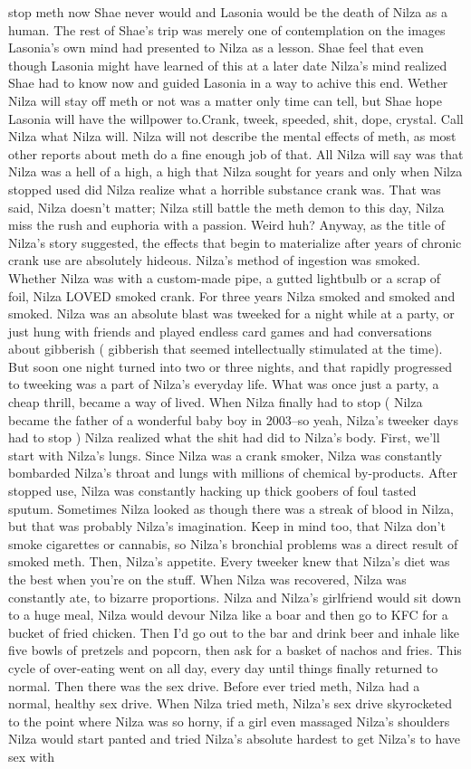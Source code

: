 \documentclass[12pt]{book}
\begin{document}
stop meth now Shae never would and Lasonia would be the death of Nilza as a human. The rest of Shae's trip was merely one of contemplation on the images Lasonia's own mind had presented to Nilza as a lesson. Shae feel that even though Lasonia might have learned of this at a later date Nilza's mind realized Shae had to know now and guided Lasonia in a way to achive this end. Wether Nilza will stay off meth or not was a matter only time can tell, but Shae hope Lasonia will have the willpower to.Crank, tweek, speeded, shit, dope, crystal. Call Nilza what Nilza will. Nilza will not describe the mental effects of meth, as most other reports about meth do a fine enough job of that. All Nilza will say was that Nilza was a hell of a high, a high that Nilza sought for years and only when Nilza stopped used did Nilza realize what a horrible substance crank was. That was said, Nilza doesn't matter; Nilza still battle the meth demon to this day, Nilza miss the rush and euphoria with a passion. Weird huh? Anyway, as the title of Nilza's story suggested, the effects that begin to materialize after years of chronic crank use are absolutely hideous. Nilza's method of ingestion was smoked. Whether Nilza was with a custom-made pipe, a gutted lightbulb or a scrap of foil, Nilza LOVED smoked crank. For three years Nilza smoked and smoked and smoked. Nilza was an absolute blast was tweeked for a night while at a party, or just hung with friends and played endless card games and had conversations about gibberish ( gibberish that seemed intellectually stimulated at the time). But soon one night turned into two or three nights, and that rapidly progressed to tweeking was a part of Nilza's everyday life. What was once just a party, a cheap thrill, became a way of lived. When Nilza finally had to stop ( Nilza became the father of a wonderful baby boy in 2003--so yeah, Nilza's tweeker days had to stop ) Nilza realized what the shit had did to Nilza's body. First, we'll start with Nilza's lungs. Since Nilza was a crank smoker, Nilza was constantly bombarded Nilza's throat and lungs with millions of chemical by-products. After stopped use, Nilza was constantly hacking up thick goobers of foul tasted sputum. Sometimes Nilza looked as though there was a streak of blood in Nilza, but that was probably Nilza's imagination. Keep in mind too, that Nilza don't smoke cigarettes or cannabis, so Nilza's bronchial problems was a direct result of smoked meth. Then, Nilza's appetite. Every tweeker knew that Nilza's diet was the best when you're on the stuff. When Nilza was recovered, Nilza was constantly ate, to bizarre proportions. Nilza and Nilza's girlfriend would sit down to a huge meal, Nilza would devour Nilza like a boar and then go to KFC for a bucket of fried chicken. Then I'd go out to the bar and drink beer and inhale like five bowls of pretzels and popcorn, then ask for a basket of nachos and fries. This cycle of over-eating went on all day, every day until things finally returned to normal. Then there was the sex drive. Before ever tried meth, Nilza had a normal, healthy sex drive. When Nilza tried meth, Nilza's sex drive skyrocketed to the point where Nilza was so horny, if a girl even massaged Nilza's shoulders Nilza would start panted and tried Nilza's absolute hardest to get Nilza's to have sex with 
\end{document}

